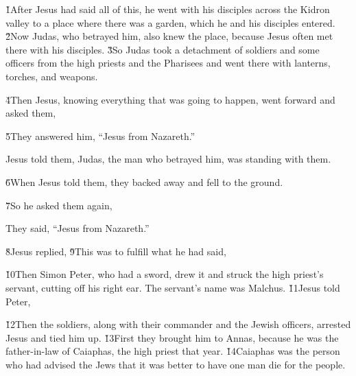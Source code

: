 \v{1}After Jesus had said all of this, he went with his disciples across the Kidron valley to a place where there was a garden, which he and his disciples entered. \v{2}Now Judas, who betrayed him, also knew the place, because Jesus often met there with his disciples. \v{3}So Judas took a detachment of soldiers and some officers from the high priests and the Pharisees and went there with lanterns, torches, and weapons.

\v{4}Then Jesus, knowing everything that was going to happen, went forward and asked them, 

\v{5}They answered him, ``Jesus from Nazareth.''

Jesus told them,  Judas, the man who betrayed him, was standing with them.

\v{6}When Jesus told them,  they backed away and fell to the ground.

\v{7}So he asked them again, 

They said, ``Jesus from Nazareth.''

\v{8}Jesus replied,  \v{9}This was to fulfill what he had said, 

\v{10}Then Simon Peter, who had a sword, drew it and struck the high priest's servant, cutting off his right ear. The servant's name was Malchus. \v{11}Jesus told Peter, 

\v{12}Then the soldiers, along with their commander and the Jewish officers, arrested Jesus and tied him up. \v{13}First they brought him to Annas, because he was the father-in-law of Caiaphas, the high priest that year. \v{14}Caiaphas was the person who had advised the Jews that it was better to have one man die for the people.

